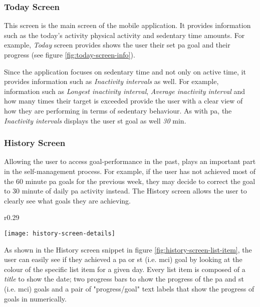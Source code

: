     
    \subsubsection{Today Screen}
    This screen is the main screen of the mobile application. It provides information such as the today's activity physical activity and sedentary time amounts. For example, \textit{Today} screen provides shows the user their set \gls{pa} goal and their progress (see figure \ref{fig:today-screen-info}). 
    
    Since the application focuses on sedentary time and not only on active time, it provides information such as \textit{Inactivity intervals} as well. For example, information such as \textit{Longest inactivity interval}, \textit{Average inactivity interval} and how many times their target is exceeded provide the user with a clear view of how they are performing in terms of sedentary behaviour. As with \gls{pa}, the \textit{Inactivity intervals} displays the user \gls{st} goal as well \textit{30} min. 
    
    \subsubsection{History Screen}
    Allowing the user to access goal-performance in the past, plays an important part in the self-management process. For example, if the user has not achieved most of the 60 minute \gls{pa} goals for the previous week, they may decide to correct the goal to 30 minute of daily \gls{pa} activity instead. The History screen allows the user to clearly see what goals they are achieving. 
    
    \begin{wrapfigure}[11]{r}{0.29\textwidth}
    \begin{center}
    \texttt{[image: history-screen-details]}
    \end{center}
    \caption{History screen list item snippet}
    \label{fig:history-screen-list-item}
    \end{wrapfigure}
    
    As shown in the History screen snippet in figure \ref{fig:history-screen-list-item}, the user can easily see if they achieved a \gls{pa} or \gls{st} (i.e. \gls{mci}) goal by looking at the colour of the specific list item for a given day. Every list item is composed of a \textit{title} to show the date; two progress bars to show the progress of the \gls{pa} and \gls{st} (i.e. \gls{mci}) goals and a pair of "progress/goal" text labels that show the progress of goals in numerically.
    
